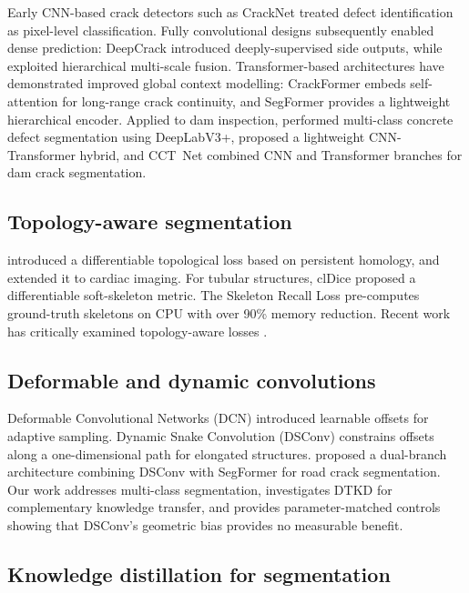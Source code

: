 \documentclass[review,authoryear]{elsarticle}
\begin{document}
Early CNN-based crack detectors such as CrackNet \citep{zhang2017cracknet} treated defect identification as pixel-level classification.
Fully convolutional designs subsequently enabled dense prediction: DeepCrack \citep{liu2019deepcrack} introduced deeply-supervised side outputs, while \citet{zou2019deepcrack} exploited hierarchical multi-scale fusion.
Transformer-based architectures have demonstrated improved global context modelling: CrackFormer \citep{liu2021crackformer} embeds self-attention for long-range crack continuity, and SegFormer \citep{xie2021segformer} provides a lightweight hierarchical encoder.
Applied to dam inspection, \citet{arafin2024concrete} performed multi-class concrete defect segmentation using DeepLabV3+, \citet{li2024dam} proposed a lightweight CNN-Transformer hybrid, and CCT~Net \citep{ling2025cctnet} combined CNN and Transformer branches for dam crack segmentation.

\subsection{Topology-aware segmentation}

\citet{hu2019topology} introduced a differentiable topological loss based on persistent homology, and \citet{clough2020topological} extended it to cardiac imaging.
For tubular structures, clDice \citep{shit2021cldice} proposed a differentiable soft-skeleton metric.
The Skeleton Recall Loss \citep{kirchhoff2024skeleton} pre-computes ground-truth skeletons on CPU with over 90\% memory reduction.
Recent work has critically examined topology-aware losses \citep{arora2025srlcritique,joo2026cts}.

\subsection{Deformable and dynamic convolutions}

Deformable Convolutional Networks (DCN) \citep{dai2017deformable} introduced learnable offsets for adaptive sampling.
Dynamic Snake Convolution (DSConv) \citep{qi2023dynamic} constrains offsets along a one-dimensional path for elongated structures.
\citet{yu2024dscformer} proposed a dual-branch architecture combining DSConv with SegFormer for road crack segmentation.
Our work addresses multi-class segmentation, investigates DTKD for complementary knowledge transfer, and provides parameter-matched controls showing that DSConv's geometric bias provides no measurable benefit.

\subsection{Knowledge distillation for segmentation}
\end{document}
